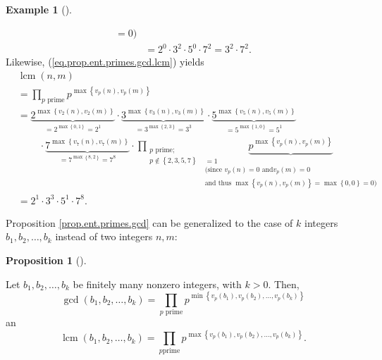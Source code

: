 \documentclass[numbers=enddot,12pt,final,onecolumn,notitlepage]{scrartcl}%
\numberwithin{exer}{subsection}
\theoremstyle{definition}
\newtheorem{prop}[theo]{Proposition}
\newenvironment{proposition}[1][]
{\begin{prop}[#1]\begin{leftbar}}
{\end{leftbar}\end{prop}}
\newtheorem{exam}[theo]{Example}
\newenvironment{example}[1][]
{\begin{exam}[#1]\begin{leftbar}}
{\end{leftbar}\end{exam}}
\let\prodnonlimits\prod
\renewcommand{\prod}{\prodnonlimits\limits}
\begin{document}
\begin{example}
\begin{align*}
{{=0\text{)}}}\\
&  =2^{0}\cdot3^{2}\cdot5^{0}\cdot7^{2}=3^{2}\cdot7^{2}.
\end{align*}
Likewise, (\ref{eq.prop.ent.primes.gcd.lcm}) yields%
\begin{align*}
&  \operatorname{lcm}\left(  n,m\right) \\
&  =\prod_{p\text{ prime}}p^{\max\left\{  v_{p}\left(  n\right)  ,v_{p}\left(
m\right)  \right\}  }\\
&  =\underbrace{2^{\max\left\{  v_{2}\left(  n\right)  ,v_{2}\left(  m\right)
\right\}  }}_{=2^{\max\left\{  0,1\right\}  }=2^{1}}\cdot\underbrace{3^{\max
\left\{  v_{3}\left(  n\right)  ,v_{3}\left(  m\right)  \right\}  }}%
_{=3^{\max\left\{  2,3\right\}  }=3^{3}}\cdot\underbrace{5^{\max\left\{
v_{5}\left(  n\right)  ,v_{5}\left(  m\right)  \right\}  }}_{=5^{\max\left\{
1,0\right\}  }=5^{1}}\\
&  \ \ \ \ \ \ \ \ \ \ \cdot\underbrace{7^{\max\left\{  v_{7}\left(  n\right)
,v_{7}\left(  m\right)  \right\}  }}_{=7^{\max\left\{  8,2\right\}  }=7^{8}%
}\cdot\prod_{\substack{p\text{ prime;}\\p\notin\left\{  2,3,5,7\right\}
}}\underbrace{p^{\max\left\{  v_{p}\left(  n\right)  ,v_{p}\left(  m\right)
\right\}  }}_{\substack{=1\\\text{(since }v_{p}\left(  n\right)  =0\text{ and
}v_{p}\left(  m\right)  =0\\\text{and thus }\max\left\{  v_{p}\left(
n\right)  ,v_{p}\left(  m\right)  \right\}  =\max\left\{  0,0\right\}
=0\text{)}}}\\
&  =2^{1}\cdot3^{3}\cdot5^{1}\cdot7^{8}.
\end{align*}

\end{example}

Proposition \ref{prop.ent.primes.gcd} can be generalized to the case of $k$
integers $b_{1},b_{2},\ldots,b_{k}$ instead of two integers $n,m$:

\begin{proposition}
\label{prop.ent.primes.gcd-k}Let $b_{1},b_{2},\ldots,b_{k}$ be finitely many
nonzero integers, with $k>0$. Then,%
\begin{equation}
\gcd\left(  b_{1},b_{2},\ldots,b_{k}\right)  =\prod_{p\text{ prime}}%
p^{\min\left\{  v_{p}\left(  b_{1}\right)  ,v_{p}\left(  b_{2}\right)
,\ldots,v_{p}\left(  b_{k}\right)  \right\}  }
\label{eq.prop.ent.primes.gcd-k.gcd}%
\end{equation}
an%
\begin{equation}
\operatorname{lcm}\left(  b_{1},b_{2},\ldots,b_{k}\right)  =\prod_{p\text{
prime}}p^{\max\left\{  v_{p}\left(  b_{1}\right)  ,v_{p}\left(  b_{2}\right)
,\ldots,v_{p}\left(  b_{k}\right)  \right\}  }.
\label{eq.prop.ent.primes.gcd-k.lcm}%
\end{equation}

\end{proposition}
\end{document}
